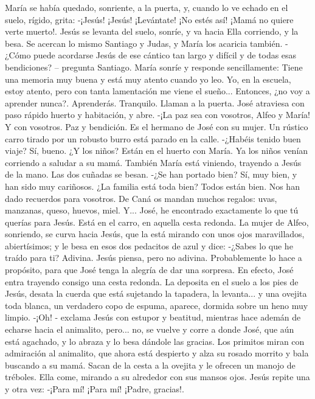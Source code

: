 \documentclass[12pt]{book} %
\begin{document}
María se había quedado, sonriente, a la puerta, y, cuando lo ve echado en el suelo, rígido, grita: 
-¡Jesús! ¡Jesús! ¡Levántate! ¡No estés así! ¡Mamá no quiere verte muerto!. 
Jesús se levanta del suelo, sonríe, y va hacia Ella corriendo, y la besa. Se acercan lo mismo Santiago y Judas, y María los 
acaricia también. 
-¿Cómo puede acordarse Jesús de ese cántico tan largo y difícil y de todas esas bendiciones? – pregunta Santiago. 
María sonríe y responde sencillamente: 
Tiene una memoria muy buena y está muy atento cuando yo leo. 
Yo, en la escuela, estoy atento, pero con tanta lamentación me viene el sueño... Entonces, ¿no voy a aprender nunca?. 
Aprenderás. Tranquilo. 
Llaman a la puerta. José atraviesa con paso rápido huerto y habitación, y abre. 
-¡La paz sea con vosotros, Alfeo y María! 
Y con vosotros. Paz y bendición. 
Es el hermano de José con su mujer. Un rústico carro tirado por un robusto burro está parado en la calle. -¿Habéis tenido buen viaje? 
Sí, bueno. ¿Y los niños? 
Están en el huerto con María. 
Ya los niños venían corriendo a saludar a su mamá. También María está viniendo, trayendo a Jesús de la mano. Las dos cuñadas se besan. 
-¿Se han portado bien? 
Sí, muy bien, y han sido muy cariñosos. ¿La familia está toda bien? 
Todos están bien. Nos han dado recuerdos para vosotros. De Caná os mandan muchos regalos: uvas, manzanas, queso, huevos, miel. Y... José, he encontrado exactamente lo que tú querías para Jesús. Está en el carro, en aquella cesta redonda. 
La mujer de Alfeo, sonriendo, se curva hacia Jesús, que la está mirando con unos ojos maravillados, abiertísimos; y le 
besa en esos dos pedacitos de azul y dice: 
-¿Sabes lo que he traído para ti? Adivina. 
Jesús piensa, pero no adivina. Probablemente lo hace a propósito, para que José tenga la alegría de dar una sorpresa. En efecto, José entra trayendo consigo una cesta redonda. La deposita en el suelo a los pies de Jesús, desata la cuerda que está sujetando la tapadera, la levanta... y una ovejita toda blanca, un verdadero copo de espuma, aparece, dormida sobre un heno muy limpio. 
-¡Oh! - exclama Jesús con estupor y beatitud, mientras hace ademán de echarse hacia el animalito, pero... no, se vuelve 
y corre a donde José, que aún está agachado, y lo abraza y lo besa dándole las gracias. 
Los primitos miran con admiración al animalito, que ahora está despierto y alza su rosado morrito y bala buscando a su 
mamá. Sacan de la cesta a la ovejita y le ofrecen un manojo de tréboles. Ella come, mirando a su alrededor con sus mansos ojos. Jesús repite una y otra vez: -¡Para mí! ¡Para mí! ¡Padre, gracias!. 
\end{document}
